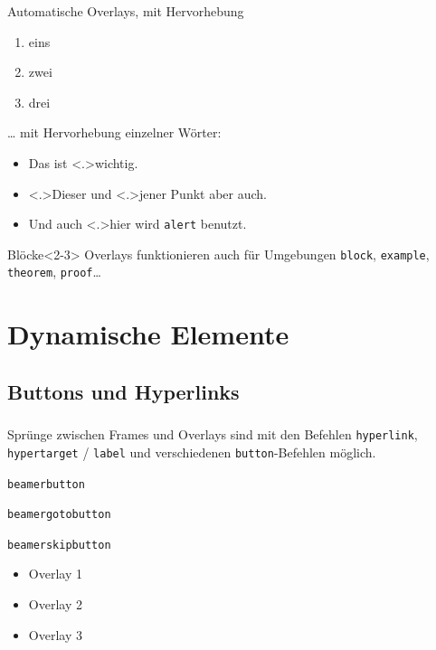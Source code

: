 \documentclass[usepdftitle=false, t]{beamer}
\begin{document}
\begin{frame}
  Automatische Overlays, mit Hervorhebung
  \begin{enumerate}[<+-| alert@+>]
    \item eins
    \item zwei
    \item drei
  \end{enumerate}
  \bvskip

  \ldots{} mit Hervorhebung einzelner Wörter:
  \begin{itemize}[<+->]
    \item Das ist \alert<.>{wichtig}.
    \item \alert<.>{Dieser} und \alert<.>{jener} Punkt aber auch.
    \item Und auch \alert<.>{hier} wird \texttt{alert} benutzt.
  \end{itemize}
  \bvskip

  \begin{block}{Blöcke}<2-3>
    Overlays funktionieren auch für Umgebungen \texttt{block},
    \texttt{example}, \texttt{theorem}, \texttt{proof}\ldots
  \end{block}
\end{frame}


\section{Dynamische Elemente}		%
\subsection{Buttons und Hyperlinks}	%

\begin{frame}[label=hyperOne]
  \frametitle{\insertsubsection}
  Sprünge zwischen Frames und Overlays sind mit den Befehlen
  \texttt{hyperlink}, \texttt{hypertarget} / \texttt{label} und
  verschiedenen \texttt{button}-Befehlen möglich.

  \begin{description}
  \item[\texttt{beamerbutton}]\hfill
	\hyperlink{jumptofirst}{}%
	\hypertarget<1>{jumptofirst}{}
  \item[\texttt{beamergotobutton}]\hfill
	\hyperlink{hyperOne<2>}{}
  \item[\texttt{beamerskipbutton}]\hfill
	\hyperlink{hyperTwo}{}
  \end{description}

  \begin{itemize}[<+->]
    \item Overlay 1
    \item Overlay 2
    \item Overlay 3
  \end{itemize}
\end{frame}
\end{document}
